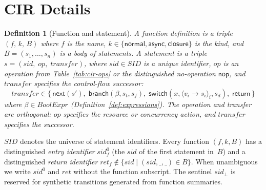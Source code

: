 \documentclass{article}
\newtheorem{definition}{Definition}
\begin{document}
\appendix

\section{CIR Details}
\label{app:cir-details}

\begin{definition}[Function and statement]
\label{def:statement}
A \emph{function definition} is a triple $(f,\,k,\,B)$ where $f$ is
the name,
$k\in\{\textsf{normal},\textsf{async},\textsf{closure}\}$ is the
kind, and $B=(s_1,\dots,s_n)$ is a body of statements.
A \emph{statement} is a triple
$s=(\mathit{sid},\;\mathit{op},\;\mathit{transfer})$, where
$\mathit{sid}\in\mathit{SID}$ is a unique identifier, $\mathit{op}$ is
an operation from Table~\ref{tab:cir-ops} or the distinguished
no-operation $\textsf{nop}$, and $\mathit{transfer}$ specifies the
control-flow successor:
\[
  \mathit{transfer} \in
  \bigl\{\,
    \textsf{next}(s'),\;
    \textsf{branch}(\beta,s_t,s_f),\;
    \textsf{switch}(x,\langle v_i\!\to\!s_i\rangle_{i},s_d),\;
    \textsf{return}
  \,\bigr\}
\]
where $\beta\in\mathit{BoolExpr}$ (Definition~\ref{def:expressions}).
The operation and transfer are orthogonal: $\mathit{op}$ specifies the
resource or concurrency action, and $\mathit{transfer}$ specifies the
successor.
\end{definition}

$\mathit{SID}$ denotes the universe of statement identifiers.  Every
function $(f,k,B)$ has a distinguished \emph{entry identifier}
$\mathit{sid}^{0}_{f}$ (the $\mathit{sid}$ of the first statement
in~$B$) and a distinguished \emph{return identifier}
$\mathit{ret}_{f}\notin\{\mathit{sid}\mid(\mathit{sid},\_,\_)\in B\}$.
When unambiguous we write $\mathit{sid}^{0}$ and $\mathit{ret}$
without the function subscript.  The sentinel $\mathit{sid}_{\bot}$ is
reserved for synthetic transitions generated from function summaries.
\end{document}
